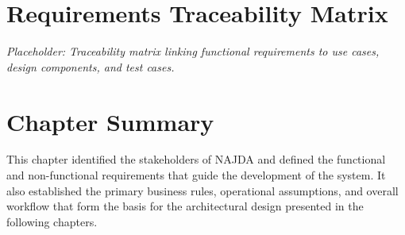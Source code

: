 
\section{Requirements Traceability Matrix}

\textit{Placeholder: Traceability matrix linking functional requirements to use cases, design components, and test cases.}


\section{Chapter Summary}

This chapter identified the stakeholders of NAJDA and defined the functional and non-functional requirements that guide the development of the system. It also established the primary business rules, operational assumptions, and overall workflow that form the basis for the architectural design presented in the following chapters.